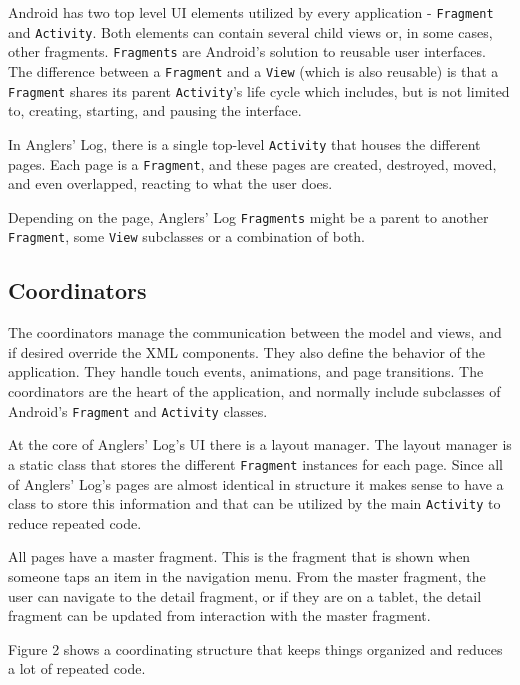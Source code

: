 \documentclass{article}
\begin{document}
	Android has two top level UI elements utilized by every application - \texttt{Fragment} and \texttt{Activity}.  Both elements can contain several child views or, in some cases, other fragments.  \texttt{Fragments} are Android's solution to reusable user interfaces.  The difference between a \texttt{Fragment} and a \texttt{View} (which is also reusable) is that a \texttt{Fragment} shares its parent \texttt{Activity}'s life cycle which includes, but is not limited to, creating, starting, and pausing the interface.

	In Anglers' Log, there is a single top-level \texttt{Activity} that houses the different pages.  Each page is a \texttt{Fragment}, and these pages are created, destroyed, moved, and even overlapped, reacting to what the user does.

	Depending on the page, Anglers' Log \texttt{Fragments} might be a parent to another \texttt{Fragment}, some \texttt{View} subclasses or a combination of both.


	\subsection{Coordinators}
	
	The coordinators manage the communication between the model and views, and if desired override the XML components.  They also define the behavior of the application.  They handle touch events, animations, and page transitions.  The coordinators are the heart of the application, and normally include subclasses of Android’s \texttt{Fragment} and \texttt{Activity} classes.
	
	At the core of Anglers' Log's UI there is a layout manager.  The layout manager is a static class that stores the different \texttt{Fragment} instances for each page.  Since all of Anglers’ Log's pages are almost identical in structure it makes sense to have a class to store this information and that can be utilized by the main \texttt{Activity} to reduce repeated code.

	All pages have a master fragment.  This is the fragment that is shown when someone taps an item in the navigation menu.  From the master fragment, the user can navigate to the detail fragment, or if they are on a tablet, the detail fragment can be updated from interaction with the master fragment. 

	Figure 2 shows a coordinating structure that keeps things organized and reduces a lot of repeated code.
	
\end{document}
